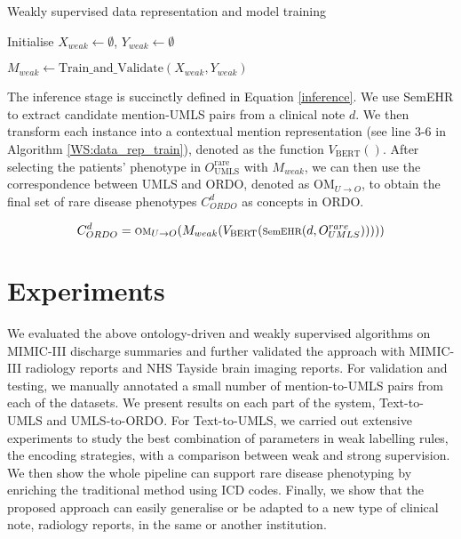 \documentclass[twocolumn]{bmcart}
\begin{document}
\begin{algorithm}[t]
\caption{Weakly supervised data representation and model training}

\label{WS:data_rep_train}
\SetAlgoLined
{}

Initialise $X_{weak} \gets \emptyset$, $Y_{weak} \gets \emptyset$\;

$M_{weak} \gets \text{Train\_and\_Validate}(X_{weak},Y_{weak})$\;
\end{algorithm}

The inference stage is succinctly defined in Equation \ref{inference}. We use SemEHR to extract candidate mention-UMLS pairs from a clinical note $d$. We then transform each instance into a contextual mention representation (see line 3-6 in Algorithm \ref{WS:data_rep_train}), denoted as the function $V_\text{BERT}()$. After selecting the patients' phenotype in $O^{\text{rare}}_{\text{UMLS}}$ with $M_{weak}$, we can then use the correspondence between UMLS and ORDO, denoted as $\text{OM}_{U\rightarrow O}$, to obtain the final set of rare disease phenotypes $C^{d}_{ORDO}$ as concepts in ORDO.

\begin{equation}\label{inference}
\scriptsize
  C^{d}_{ORDO} = \text{OM}_{U\rightarrow O}(M_{weak}(V_\text{BERT}(\text{SemEHR}(d,O^{rare}_{UMLS})))))
\end{equation}

\section*{Experiments}
\label{sec:experiments}

We evaluated the above ontology-driven and weakly supervised algorithms on MIMIC-III discharge summaries and further validated the approach with MIMIC-III radiology reports and NHS Tayside brain imaging reports. For validation and testing, we manually annotated a small number of mention-to-UMLS pairs from each of the datasets. We present results on each part of the system, Text-to-UMLS and UMLS-to-ORDO. For Text-to-UMLS, we carried out extensive experiments to study the best combination of parameters in weak labelling rules, the encoding strategies, with a comparison between weak and strong supervision. We then show the whole pipeline can support rare disease phenotyping by enriching the traditional method using ICD codes. Finally, we show that the proposed approach can easily generalise or be adapted to a new type of clinical note, radiology reports, in the same or another institution.
\end{document}
